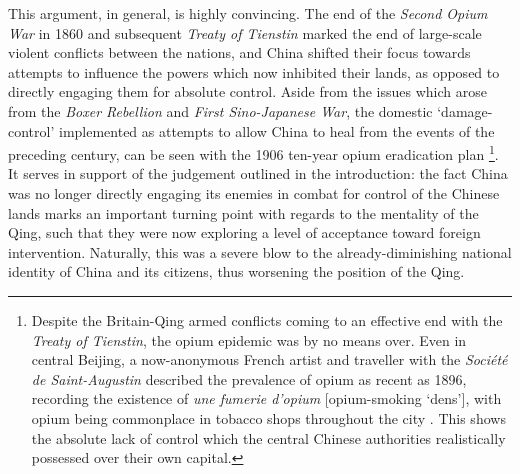 \documentclass[a4paper,oneside]{article}
\begin{document}
This argument, in general, is highly convincing. The end of the \textit{Second
Opium War} in 1860 and subsequent \textit{Treaty of Tienstin} marked the end of
large-scale violent conflicts between the nations, and China shifted their focus
towards attempts to influence the powers which now inhibited their lands, as
opposed to directly engaging them for absolute control. Aside from the issues
which arose from the \textit{Boxer Rebellion} and \textit{First Sino-Japanese
War}, the domestic `damage-control' implemented as attempts to allow China to
heal from the events of the preceding century, can be seen with the 1906
ten-year opium eradication plan
\autocites{Trocki:1999}{Owen:1934}\footnote{Despite the Britain-Qing armed
conflicts coming to an effective end with the \textit{Treaty of Tienstin}, the
opium epidemic was by no means over. Even in central Beijing, a now-anonymous
French artist and traveller with the \textit{Soci\'et\'e de Saint-Augustin}
described the prevalence of opium as recent as 1896, recording the existence of
\textit{une fumerie d'opium} [opium-smoking `dens'], with opium being
commonplace in tobacco shops throughout the city \autocite{FrenchArtist:1896}.
This shows the absolute lack of control which the central Chinese authorities
realistically possessed over their own capital.}. It serves in support of the
judgement outlined in the introduction: the fact China was no longer directly
engaging its enemies in combat for control of the Chinese lands marks an
important turning point with regards to the mentality of the Qing, such that
they were now exploring a level of acceptance toward foreign intervention.
Naturally, this was a severe blow to the already-diminishing national identity
of China and its citizens, thus worsening the position of the Qing.

\end{document}
